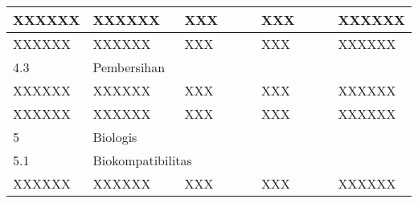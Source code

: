 \documentclass[11pt,a4paper,twoside,onecolumn]{book}
\begin{document}
\begin{table}
\begin{tabular}{p{0.1\linewidth} p{0.25\linewidth} p{0.25\linewidth} p{0.25\linewidth} p{0.15\linewidth}}
				\hline
				{XXXXXX} & {XXXXXX} & {XXX} & {XXX} & {XXXXXX} \\
				\hline
				{XXXXXX} & {XXXXXX} & {XXX} & {XXX} & {XXXXXX} \\
				\hline
				\hline
				4.3 & \multicolumn{4}{l}{Pembersihan} \\
				\hline
				{XXXXXX} & {XXXXXX} & {XXX} & {XXX} & {XXXXXX} \\
				\hline
				{XXXXXX} & {XXXXXX} & {XXX} & {XXX} & {XXXXXX} \\
				\hline
				5 & \multicolumn{4}{l}{Biologis} \\
				\hline
				5.1 & \multicolumn{4}{l}{Biokompatibilitas} \\
				\hline
				{XXXXXX} & {XXXXXX} & {XXX} & {XXX} & {XXXXXX} \\
				
			\end{tabular}
		\end{table}
		
	\newpage
	
	
\end{document}
